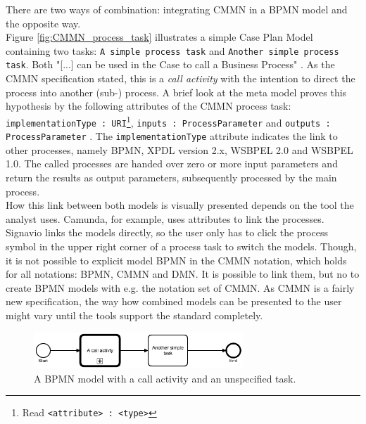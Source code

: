 There are two ways of combination: integrating CMMN in a BPMN model and the opposite way. \\
Figure \ref{fig:CMMN_process_task} illustrates a simple Case Plan Model containing two tasks: \texttt{A simple process task} and \texttt{Another simple process task}. Both "[...] can be used in the Case to call a Business Process" \cite{CMMNspec2014}. As the CMMN specification stated, this is a \textit{call activity} with the intention to direct the process into another (sub-) process. A brief look at the meta model proves this hypothesis by the following attributes of the CMMN process task: \texttt{implementationType : URI}\footnote{Read \texttt{<attribute> : <type>}}, \texttt{inputs : ProcessParameter} and \texttt{outputs : ProcessParameter} \cite{CMMNspec2014}. The \texttt{implementationType} attribute indicates the link to other processes, namely \ac{BPMN}, \ac{XPDL} version 2.x, \ac{WSBPEL} 2.0 and  \ac{WSBPEL} 1.0. The called processes are handed over zero or more input parameters and return the results as output parameters, subsequently processed by the main process. \\
How this link between both models is visually presented depends on the tool the analyst uses. Camunda, for example, uses attributes to link the processes. Signavio links the models directly, so the user only has to click the process symbol in the upper right corner of a process task to switch the models. Though, it is not possible to explicit model BPMN in the CMMN notation, which holds for all notations: BPMN, CMMN and DMN. It is possible to link them, but no to create BPMN models with e.g. the notation set of CMMN. As CMMN is a fairly new specification, the way how combined models can be presented to the user might vary until the tools support the standard completely. \\

\begin{figure}
  \centering
    \includegraphics[width=0.7\textwidth]{../figures/chapter_combinations/BPMN_Call_Task.png}
      \caption{A BPMN model with a call activity and an unspecified task.}
      \label{fig:BPMN_call_activity}
\end{figure}

